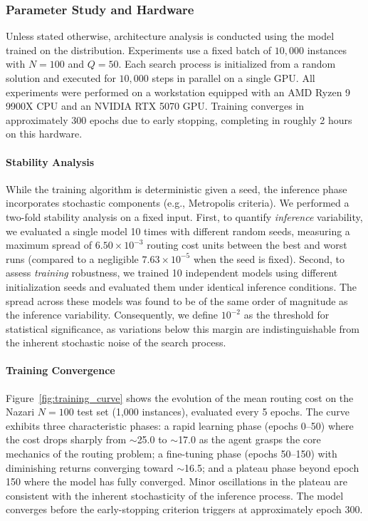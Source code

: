 \documentclass[letterpaper]{article} %
\begin{document}
\subsubsection{Parameter Study and Hardware}
Unless stated otherwise, architecture analysis is conducted using the model trained on the \citet{nazari_reinforcement_2018} distribution. Experiments use a fixed batch of $10{,}000$ instances with $N = 100$ and $Q=50$. Each search process is initialized from a random solution and executed for $10{,}000$ steps in parallel on a single GPU.
All experiments were performed on a workstation equipped with an AMD Ryzen 9 9900X CPU and an NVIDIA RTX 5070 GPU. Training converges in approximately 300 epochs due to early stopping, completing in roughly 2 hours on this hardware.

\paragraph{Stability Analysis}
While the training algorithm is deterministic given a seed, the inference phase incorporates stochastic components (e.g., Metropolis criteria). We performed a two-fold stability analysis on a fixed input. First, to quantify \textit{inference} variability, we evaluated a single model 10 times with different random seeds, measuring a maximum spread of $6.50 \times 10^{-3}$ routing cost units between the best and worst runs (compared to a negligible $7.63 \times 10^{-5}$ when the seed is fixed). Second, to assess \textit{training} robustness, we trained 10 independent models using different initialization seeds and evaluated them under identical inference conditions. The spread across these models was found to be of the same order of magnitude as the inference variability. Consequently, we define $10^{-2}$ as the threshold for statistical significance, as variations below this margin are indistinguishable from the inherent stochastic noise of the search process.

\paragraph{Training Convergence}
Figure~\ref{fig:training_curve} shows the evolution of the mean routing cost on the Nazari $N=100$ test set (1,000 instances), evaluated every 5 epochs. The curve exhibits three characteristic phases: a rapid learning phase (epochs 0--50) where the cost drops sharply from $\sim$25.0 to $\sim$17.0 as the agent grasps the core mechanics of the routing problem; a fine-tuning phase (epochs 50--150) with diminishing returns converging toward $\sim$16.5; and a plateau phase beyond epoch 150 where the model has fully converged. Minor oscillations in the plateau are consistent with the inherent stochasticity of the inference process. The model converges before the early-stopping criterion triggers at approximately epoch 300.
\end{document}
